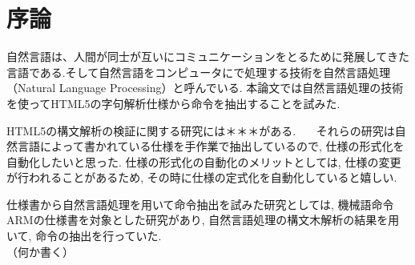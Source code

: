 \documentclass[uplatex,a4j]{jsreport}
\begin{document}
\chapter{序論}

自然言語は、人間が同士が互いにコミュニケーションをとるために発展してきた言語である.そして自然言語をコンピュータにで処理する技術を自然言語処理（Natural Language Processing）と呼んでいる.
本論文では自然言語処理の技術を使ってHTML5の字句解析仕様から命令を抽出することを試みた.

HTML5の構文解析の検証に関する研究には＊＊＊がある. ~\cite{XSSAuditor}~\cite{トランスデューサの包含関係}~\cite{HTML5Testing}それらの研究は自然言語によって書かれている仕様を手作業で抽出しているので, 仕様の形式化を自動化したいと思った. 
仕様の形式化の自動化のメリットとしては, 仕様の変更が行われることがあるため, その時に仕様の定式化を自動化していると嬉しい.


仕様書から自然言語処理を用いて命令抽出を試みた研究としては, 機械語命令ARMの仕様書を対象とした研究があり, 
自然言語処理の構文木解析の結果を用いて, 命令の抽出を行っていた.~\cite{arm}\\



（何か書く）
\end{document}
